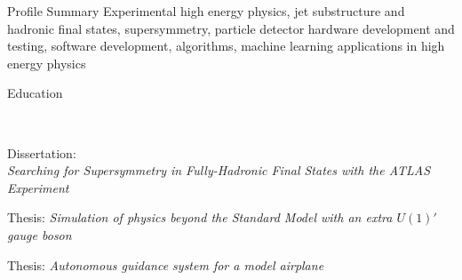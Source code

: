 \documentclass{resume}
\begin{document}

\begin{rsection}{Profile Summary}
  Experimental high energy physics, jet substructure and hadronic final states, supersymmetry, particle detector hardware development and testing, software development, algorithms, machine learning applications in high energy physics
\end{rsection}


\begin{rsection}{Education}

  \\
  \vspace{-0.2em}
  \item Dissertation: \\{\em Searching for Supersymmetry in Fully-Hadronic Final States with the ATLAS Experiment}


  \vspace{-0.2em}
  \item Thesis: {\em Simulation of physics beyond the Standard Model with an extra $U(1)'$ gauge boson}




  \vspace{-0.2em}
  \item Thesis: {\em Autonomous guidance system for a model airplane}

\end{rsection}
\end{document}
